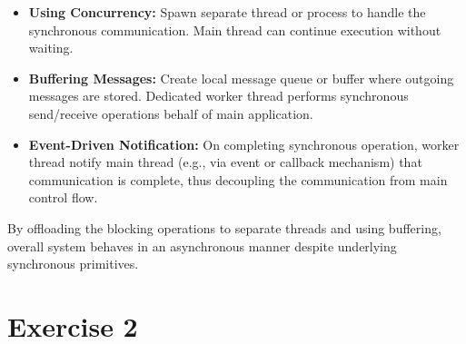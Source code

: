 \documentclass{article}
\newcommand{\exercise}[1]{
    \section*{Exercise #1}
    \markboth{Exercise #1}{}
}
\begin{document}
\begin{enumerate}[label=\textbf{\makebox[1cm][l]{\Huge\text{(\stylishfont\alph*)}}}, leftmargin=!, labelindent=0pt]
  \begin{itemize}
    \item \textbf{Using Concurrency:} Spawn separate thread or process
    to handle the synchronous communication. Main thread can continue
    execution without waiting.
    \item \textbf{Buffering Messages:} Create local message queue or
    buffer where outgoing messages are stored. Dedicated worker thread
    performs synchronous send/receive operations behalf of main
    application.
    \item \textbf{Event-Driven Notification:} On completing synchronous
    operation, worker thread notify main thread (e.g., via 
    event or callback mechanism) that communication is complete,
    thus decoupling the communication from main control flow.
  \end{itemize}

By offloading the blocking operations to separate threads and using
buffering, overall system behaves in an asynchronous manner despite
underlying synchronous primitives.

\end{enumerate}



\newpage

\exercise{2}


\newpage
\printbibliography
\end{document}
